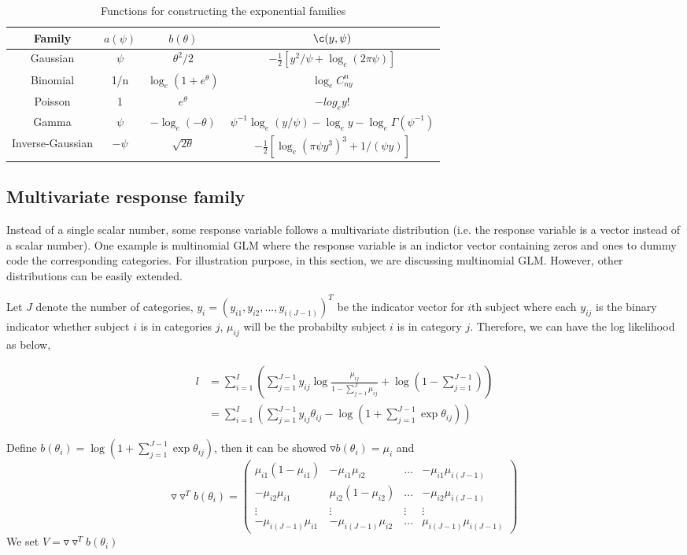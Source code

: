 \begin{table}[h]
\centering
\begin{tabular}{cccc}
Family & $a(\psi)$ & $b(\theta)$ & $\c(y, \psi)$ \\
\hline
Gaussian & $\psi$ & $\theta^2/2$ & $-\frac{1}{2}\left[y^2/\psi+\log_e(2\pi\psi)\right]$ \\
Binomial & 1/n & $\log_e(1+e^\theta)$ & $\log_eC^n_{ny}$ \\
Poisson & 1 & $e^\theta$ & $-log_ey!$ \\
Gamma & $\psi$ & $-\log_e(-\theta)$ & $\psi^{-1}\log_e(y/\psi) - \log_ey - \log_e\Gamma(\psi^{-1})$ \\
Inverse-Gaussian & $-\psi$ & $\sqrt{2\theta}$ & $-\frac{1}{2}\left[\log_e(\pi\psi y^3)^3 + 1/(\psi y) \right]$ \\
\end{tabular}
\caption{Functions for constructing the exponential families}
\label{tab:glm_func}
\end{table}

\subsection{Multivariate response family}
Instead of a single scalar number, some response variable follows a multivariate distribution (i.e. the response variable is a vector instead of a scalar number). One example is multinomial GLM where the response variable is an indictor vector containing zeros and ones to dummy code the corresponding categories. For illustration purpose, in this section, we are discussing multinomial GLM. However, other distributions can be easily extended.

Let $J$ denote the number of categories, $y_i=(y_{i1}, y_{i2}, ..., y_{i(J-1)})^T$ be the indicator vector for $i$th subject where each $y_{ij}$ is the binary indicator whether subject $i$ is in categories $j$, $\mu_{ij}$ will be the probabilty subject $i$ is in category $j$. Therefore, we can have the log likelihood as below,

\begin{align*}
l & = \sum_{i=1}^{I} \left(\sum_{j=1}^{J-1} y_{ij} \log{\frac{\mu_{ij}}{1-\sum_{j=1}^{J}\mu_{ij}}} + \log(1-\sum_{j=1}^{J-1}) \right)\\
 & = \sum_{i=1}^I \left( \sum_{j=1}^{J-1} y_{ij} \theta_{ij} - \log(1+\sum_{j=1}^{J-1}\exp\theta_{ij}) \right)
\end{align*}

Define $b(\theta_i) = \log(1+\sum_{j=1}^{J-1}\exp\theta_{ij})$, then it can be showed $\triangledown b(\theta_i) = \mu_i$ and
\[
\triangledown \triangledown^T b(\theta_i) = \left( \begin{array}{cccc}
\mu_{i1}(1-\mu_{i1}) & -\mu_{i1}\mu_{i2} & ... & -\mu_{i1}\mu_{i(J-1)} \\
-\mu_{i2}\mu_{i1} & \mu_{i2}(1-\mu_{i2}) & ... & -\mu_{i2}\mu_{i(J-1)} \\
\vdots & \vdots & \vdots & \vdots \\
-\mu_{i(J-1)}\mu_{i1} & -\mu_{i(J-1)}\mu_{i2} & ... & \mu_{i(J-1)}\mu_{i(J-1)}
\end{array} \right)
\]
We set $V = \triangledown \triangledown^T b(\theta_i)$

